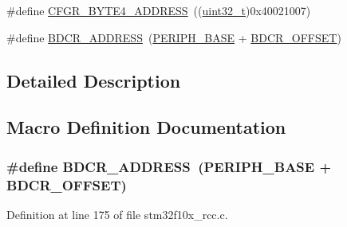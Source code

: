 \begin{DoxyCompactItemize}
\item 
\#define \hyperlink{group___r_c_c___private___defines_ga5fea86b59ec4be059d922db57cca3b3f}{C\+F\+G\+R\+\_\+\+B\+Y\+T\+E4\+\_\+\+A\+D\+D\+R\+E\+SS}~((\hyperlink{_p_e___types_8h_a33594304e786b158f3fb30289278f5af}{uint32\+\_\+t})0x40021007)
\item 
\#define \hyperlink{group___r_c_c___private___defines_ga40b5a415d697b6af7babd8a208c92435}{B\+D\+C\+R\+\_\+\+A\+D\+D\+R\+E\+SS}~(\hyperlink{openmotestm_2library_2inc_2stm32f10x__map_8h_a9171f49478fa86d932f89e78e73b88b0}{P\+E\+R\+I\+P\+H\+\_\+\+B\+A\+SE} + \hyperlink{openmotestm_2library_2src_2stm32f10x__rcc_8c_a5f8a0c3cb5f5c835bf7eef09515138ad}{B\+D\+C\+R\+\_\+\+O\+F\+F\+S\+ET})
\end{DoxyCompactItemize}


\subsection{Detailed Description}


\subsection{Macro Definition Documentation}
\subsubsection[{\texorpdfstring{B\+D\+C\+R\+\_\+\+A\+D\+D\+R\+E\+SS}{BDCR_ADDRESS}}]{\setlength{\rightskip}{0pt plus 5cm}\#define B\+D\+C\+R\+\_\+\+A\+D\+D\+R\+E\+SS~({\bf P\+E\+R\+I\+P\+H\+\_\+\+B\+A\+SE} + {\bf B\+D\+C\+R\+\_\+\+O\+F\+F\+S\+ET})}\hypertarget{group___r_c_c___private___defines_ga40b5a415d697b6af7babd8a208c92435}{}\label{group___r_c_c___private___defines_ga40b5a415d697b6af7babd8a208c92435}


Definition at line 175 of file stm32f10x\+\_\+rcc.\+c.

